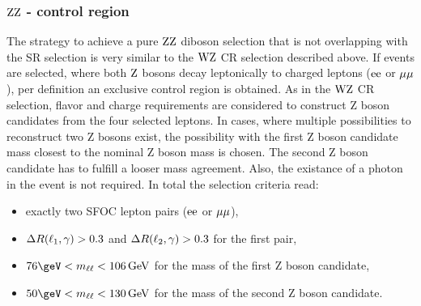 \subsubsection*{$\mathrm{Z}\mathrm{Z}$ - control region}
The strategy to achieve a pure $\mathrm{Z}\mathrm{Z}$ diboson selection that is not overlapping with the SR selection is very similar to the $\mathrm{W}\mathrm{Z}$ CR selection described above. If events are selected, where both $\mathrm{Z}$ bosons decay leptonically to charged leptons ($\mathrm{e}\mathrm{e}$ or $\mu\mu$), per definition an exclusive control region is obtained. As in the $\mathrm{W}\mathrm{Z}$ CR selection, flavor and charge requirements are considered to construct Z boson candidates from the four selected leptons. In cases, where multiple possibilities to reconstruct two Z bosons exist, the possibility with the first Z boson candidate mass closest to the nominal Z boson mass is chosen. The second Z boson candidate has to fulfill a looser mass agreement. Also, the existance of a photon in the event is not required. In total the selection criteria read:
\begin{itemize}
 \item exactly two SFOC lepton pairs ($\mathrm{e}\mathrm{e}$ or $\mu\mu$),
 \item $\Delta R(\ell_1,\gamma)>0.3$ and $\Delta R(\ell_2,\gamma)>0.3$ for the first pair,
 \item $76\geV<m_{\ell\ell}<106\GeV$ for the mass of the first Z boson candidate,
 \item $50\geV<m_{\ell\ell}<130\GeV$ for the mass of the second Z boson candidate.
\end{itemize}
